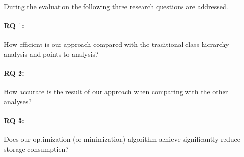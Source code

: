 \documentclass{llncs}
\begin{document}
During the evaluation the following three research questions are addressed.

\paragraph{RQ 1:} How efficient is our approach compared with the traditional class hierarchy analysis and points-to analysis?

\paragraph{RQ 2:} How accurate is the result of our approach when comparing with the other analyses?

\paragraph{RQ 3:} Does our optimization (or minimization) algorithm achieve significantly reduce storage consumption?

\end{document}

